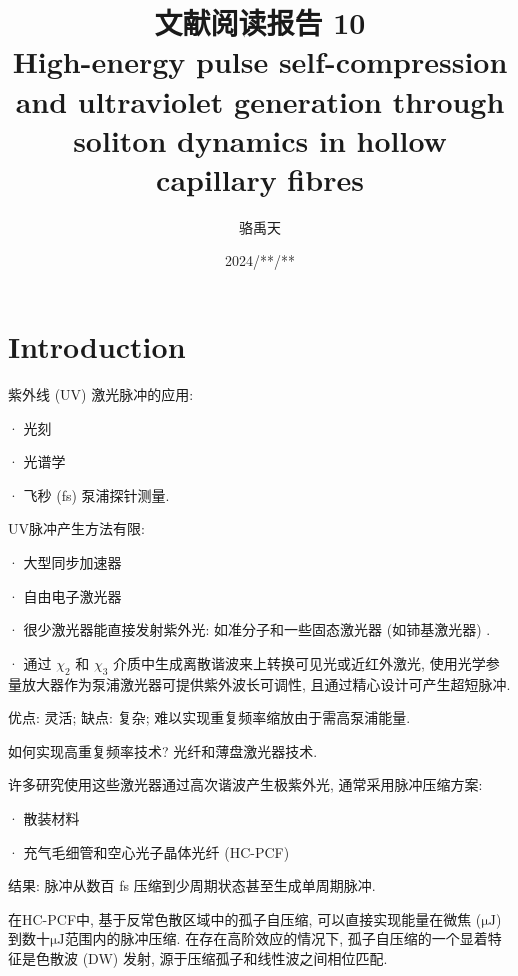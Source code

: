 \documentclass[14pt,a4paper,oneside]{article}
\title{\textbf{文献阅读报告 10\\High-energy pulse self-compression and ultraviolet generation through soliton dynamics in hollow capillary fibres}}                           %
\author{骆禹天}                                           %
\date{2024/**/**}                                        %
\begin{document}

\maketitle

\setcounter{page}{1}          %


\tableofcontents              %

\newpage
\setcounter{page}{1}          %







\section{Introduction}

紫外线 (UV) 激光脉冲的应用:

· 光刻

· 光谱学

· 飞秒 (fs) 泵浦探针测量. 

UV脉冲产生方法有限:

· 大型同步加速器

· 自由电子激光器

· 很少激光器能直接发射紫外光: 如准分子和一些固态激光器 (如铈基激光器) . 

· 通过 $\chi_2$ 和 $\chi_3$ 介质中生成离散谐波来上转换可见光或近红外激光, 使用光学参量放大器作为泵浦激光器可提供紫外波长可调性, 且通过精心设计可产生超短脉冲. 

优点: 灵活; 缺点: 复杂; 难以实现重复频率缩放由于需高泵浦能量. 

如何实现高重复频率技术? 光纤和薄盘激光器技术.

许多研究使用这些激光器通过高次谐波产生极紫外光, 通常采用脉冲压缩方案:

· 散装材料\cite{proninHighpowerMultimegahertzSource2015}

· 充气毛细管和空心光子晶体光纤 (HC-PCF) 

结果: 脉冲从数百 fs 压缩到少周期状态甚至生成单周期脉冲. 

在HC-PCF中, 基于反常色散区域中的孤子自压缩, 可以直接实现能量在微焦 ($\mathrm{\mu J}$) 到数十$\mathrm{\mu J}$范围内的脉冲压缩. 在存在高阶效应的情况下, 孤子自压缩的一个显着特征是色散波 (DW) 发射, 源于压缩孤子和线性波之间相位匹配\cite{akhmedievCherenkovRadiationEmitted1995, erkintaloCascadedPhaseMatching2012}. 
\end{document}
